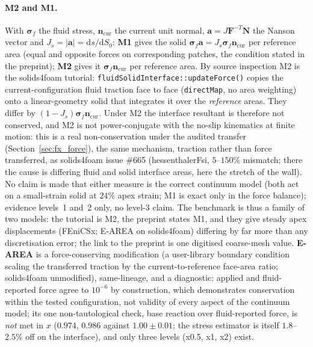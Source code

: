 \documentclass[sn-mathphys,Numbered]{sn-jnl}
\begin{document}
\paragraph{M2 and M1.}
With $\bm\sigma_f$ the fluid stress, $\bm n_\mathrm{cur}$ the current unit normal, $\bm a=J\bm F^{-T}\bm N$ the Nanson vector and $J_s=|\bm a|=\mathrm{d}s/\mathrm{d}S_0$: \textbf{M1} gives the solid $\bm\sigma_f\bm a=J_s\bm\sigma_f\bm n_\mathrm{cur}$ per reference area (equal and opposite forces on corresponding patches, the condition stated in the preprint); \textbf{M2} gives it $\bm\sigma_f\bm n_\mathrm{cur}$ per reference area.
By source inspection M2 is the solids4foam tutorial: \texttt{fluidSolidInterface::updateForce()} copies the current-configuration fluid traction face to face (\texttt{directMap}, no area weighting) onto a linear-geometry solid that integrates it over the \emph{reference} areas.
They differ by $(1-J_s)\bm\sigma_f\bm n_\mathrm{cur}$.
Under M2 the interface resultant is therefore not conserved, and M2 is not power-conjugate with the no-slip kinematics at finite motion: this is a real non-conservation under the audited transfer (Section~\ref{sec:fx_force}), the same mechanism, traction rather than force transferred, as solids4foam issue \#665 (hessenthalerFsi, $5$--$150\%$ mismatch; there the cause is differing fluid and solid interface areas, here the stretch of the wall).
No claim is made that either measure is the correct continuum model (both act on a small-strain solid at $24\%$ apex strain; M1 is exact only in the force balance); evidence levels~1 and~2 only, no level-3 claim.
The benchmark is thus a family of two models: the tutorial is M2, the preprint states M1, and they give steady apex displacements (FEniCSx; E-AREA on solids4foam) differing by far more than any discretisation error; the link to the preprint is one digitised coarse-mesh value.
\textbf{E-AREA} is a force-conserving modification (a user-library boundary condition scaling the transferred traction by the current-to-reference face-area ratio; solids4foam unmodified), same-lineage, and a diagnostic: applied and fluid-reported force agree to $10^{-6}$ by construction, which demonstrates conservation within the tested configuration, not validity of every aspect of the continuum model; its one non-tautological check, base reaction over fluid-reported force, is \emph{not} met in $x$ ($0.974$, $0.986$ against $1.00\pm0.01$; the stress estimator is itself $1.8$--$2.5\%$ off on the interface), and only three levels (x0.5, x1, x2) exist.
\end{document}
